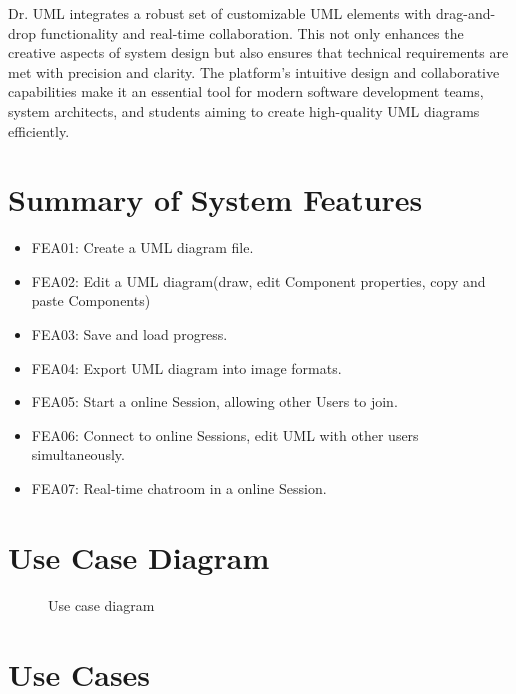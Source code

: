 \documentclass[12pt]{article}
\begin{document}
Dr. UML integrates a robust set of customizable UML elements with drag-and-drop functionality and real-time collaboration. This not only enhances the creative aspects of system design but also ensures that technical requirements are met with precision and clarity. The platform's intuitive design and collaborative capabilities make it an essential tool for modern software development teams, system architects, and students aiming to create high-quality UML diagrams efficiently.



\section{Summary of System Features}

\begin{itemize}
    \item FEA01: Create a UML diagram file.
    \item FEA02: Edit a UML diagram(draw, edit Component properties, copy and paste Components)
    \item FEA03: Save and load progress.
    \item FEA04: Export UML diagram into image formats.
    \item FEA05: Start a online Session, allowing other Users to join.
    \item FEA06: Connect to online Sessions, edit UML with other users simultaneously.
    \item FEA07: Real-time chatroom in a online Session.
\end{itemize}


\section{Use Case Diagram}

\begin{figure}[htbp]
  \centering
  
  \caption{Use case diagram}
\end{figure}

\section{Use Cases}
\end{document}
